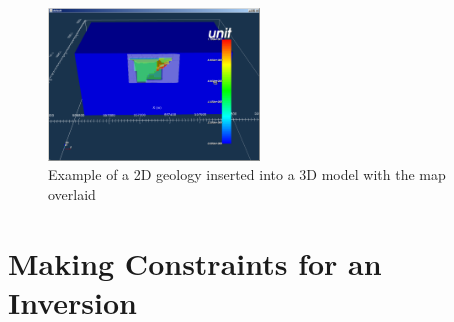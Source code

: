 \begin{figure} [h]
    \centering
    \includegraphics[width=0.5\textwidth]{images/MaptoModel/mapModelCross3D.PNG}
    \caption{Example of a 2D geology inserted into a 3D model with the map overlaid}
    \label{fig:mapModelCross3D}
\end{figure}
\FloatBarrier
\section{Making Constraints for an Inversion}
\label{sec:Making Constraints for and Inversion}

